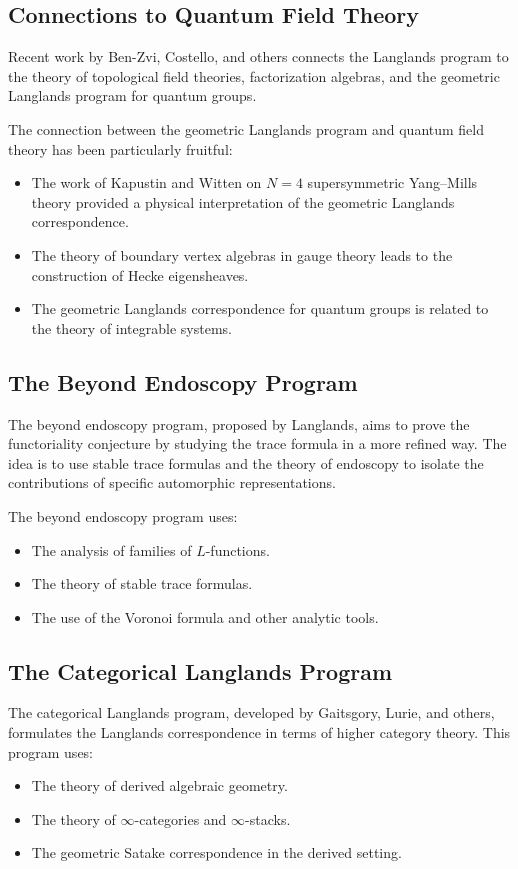 \subsection{Connections to Quantum Field Theory}

Recent work by Ben-Zvi, Costello, and others connects the Langlands program to the theory of topological field theories, factorization algebras, and the geometric Langlands program for quantum groups.

The connection between the geometric Langlands program and quantum field theory has been particularly fruitful:
\begin{itemize}
\item The work of Kapustin and Witten on $N=4$ supersymmetric Yang--Mills theory provided a physical interpretation of the geometric Langlands correspondence.
\item The theory of boundary vertex algebras in gauge theory leads to the construction of Hecke eigensheaves.
\item The geometric Langlands correspondence for quantum groups is related to the theory of integrable systems.
\end{itemize}

\subsection{The Beyond Endoscopy Program}

The beyond endoscopy program, proposed by Langlands, aims to prove the functoriality conjecture by studying the trace formula in a more refined way. The idea is to use stable trace formulas and the theory of endoscopy to isolate the contributions of specific automorphic representations.

The beyond endoscopy program uses:
\begin{itemize}
\item The analysis of families of $L$-functions.
\item The theory of stable trace formulas.
\item The use of the Voronoi formula and other analytic tools.
\end{itemize}

\subsection{The Categorical Langlands Program}

The categorical Langlands program, developed by Gaitsgory, Lurie, and others, formulates the Langlands correspondence in terms of higher category theory. This program uses:
\begin{itemize}
\item The theory of derived algebraic geometry.
\item The theory of $\infty$-categories and $\infty$-stacks.
\item The geometric Satake correspondence in the derived setting.
\end{itemize}

